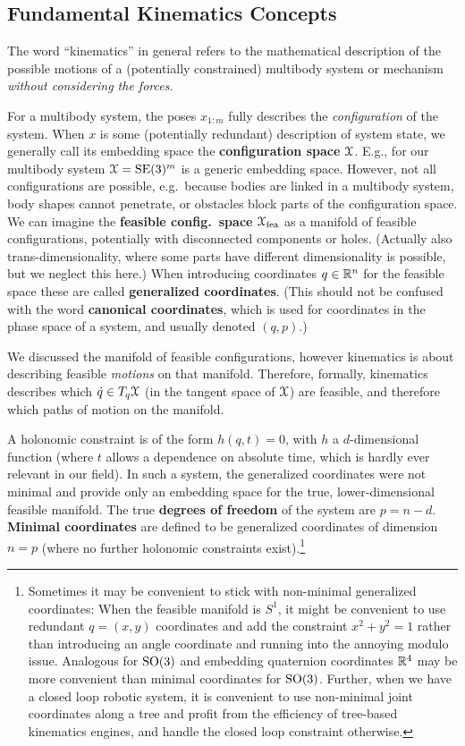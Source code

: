 \subsection{Fundamental Kinematics Concepts}

The word ``kinematics'' in general refers to the mathematical
description of the possible motions of a (potentially constrained) multibody
system or mechanism \emph{without considering the forces}.

For a multibody system, the poses $x_{1:m}$ fully describes the
\emph{configuration} of the system. When $x$ is some (potentially
redundant) description of system state, we generally call its
embedding space the \textbf{configuration space} ${\cal X}$. E.g., for our
multibody system ${\cal X}=\text{SE}(3)^m$ is a generic embedding space. However, not all
configurations are possible, e.g.\ because bodies are linked in a multibody
system, body shapes cannot penetrate, or obstacles block parts of the
configuration space. We can imagine the \textbf{feasible config.\ space}
${\cal X}_\text{fea}$ as a manifold of feasible configurations, potentially
with disconnected components or holes. (Actually also
trans-dimensionality, where some parts have different dimensionality is
possible, but we neglect this here.) When introducing 
coordinates $q\in{\mathbb{R}}^n$ for the feasible space these are called
\textbf{generalized coordinates}. (This should not be confused with the word
\textbf{canonical coordinates}, which is used for coordinates in the phase
space of a system, and usually denoted $(q,p)$.)

We discussed the manifold of feasible
configurations, however kinematics is about describing feasible
\emph{motions} on that manifold. Therefore, formally, kinematics
describes which $\dot q \in T_q {\cal X}$ (in the tangent space of ${\cal X}$)
are feasible, and therefore which paths of motion on the manifold.

A holonomic constraint is of the form $h(q, t)=0$, with $h$ a $d$-dimensional
function (where $t$ allows a dependence
on absolute time, which is hardly ever relevant in our field). In such a system,
the generalized coordinates were not minimal and provide only an
embedding space for the true, lower-dimensional feasible manifold. The
true \textbf{degrees of freedom} of the system are $p=n-d$. \textbf{Minimal
  coordinates} are defined to be generalized coordinates of dimension
$n=p$ (where no further holonomic constraints
exist).\footnote{Sometimes it may be convenient to stick with
non-minimal generalized coordinates: When the feasible manifold is
$S^1$, it might be convenient to use redundant $q=(x,y)$ coordinates
and add the constraint $x^2+y^2=1$ rather than
introducing an angle coordinate and running into the annoying modulo issue. Analogous
for $\text{SO}(3)$ and embedding quaternion coordinates ${\mathbb{R}}^4$ may be more
convenient than minimal coordinates for $\text{SO}(3)$. Further, when we
have a closed loop robotic system, it is convenient to use non-minimal
joint coordinates along a tree and profit from the efficiency of tree-based
kinematics engines, and handle the closed loop constraint
otherwise.}

